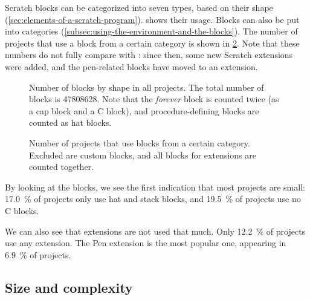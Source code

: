 \documentclass[../main]{subfiles}
\begin{document}
Scratch blocks can be categorized into seven types, based on their shape (\cref{sec:elements-of-a-scratch-program}).
 shows their usage.
Blocks can also be put into categories (\cref{subsec:using-the-environment-and-the-blocks}).
The number of projects that use a block from a certain category is shown in \cref{fig:block-categories}.
Note that these numbers do not fully compare with \textcite{aivaloglouHowKidsCode2016}: since then, some new Scratch extensions were added, and the pen-related blocks have moved to an extension.

\begin{figure}
    \centering
    
    \caption{
        Number of blocks by shape in all projects.
        The total number of blocks is \num{47808628}.
        Note that the \textit{forever} block is counted twice (as a cap block and a C block), and procedure-defining blocks are counted as hat blocks.
    }
    \label{fig:block-shapes}
\end{figure}

\begin{figure}
    \centering
    
    \caption{
        Number of projects that use blocks from a certain category.
        Excluded are custom blocks, and all blocks for extensions are counted together.
    }
    \label{fig:block-categories}
\end{figure}

By looking at the blocks, we see the first indication that most projects are small: \qty{17.0}{\percent} of projects only use hat and stack blocks, and \qty{19.5}{\percent} of projects use no C blocks.

We can also see that extensions are not used that much.
Only \qty{12.2}{\percent} of projects use any extension.
The Pen extension is the most popular one, appearing in \qty{6.9}{\percent} of projects.

\subsection{Size and complexity}\label{subsec:size-and-complexity}
\end{document}
